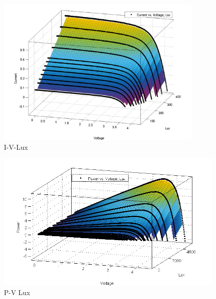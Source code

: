   \begin{figure}[H]
  \centering
   \includegraphics[width=0.9\textwidth]{images/I-V-lux}
  \caption{I-V-Lux}
  \label{fig:IVgraph}
  
  \end{figure}
    
\begin{figure}[H]
  \begin{center}
  \includegraphics[width=\textwidth]{images/PV_LUX}
  \caption{ P-V Lux}
  \label{fig:PVgraph}
  \end{center}
\end{figure}

